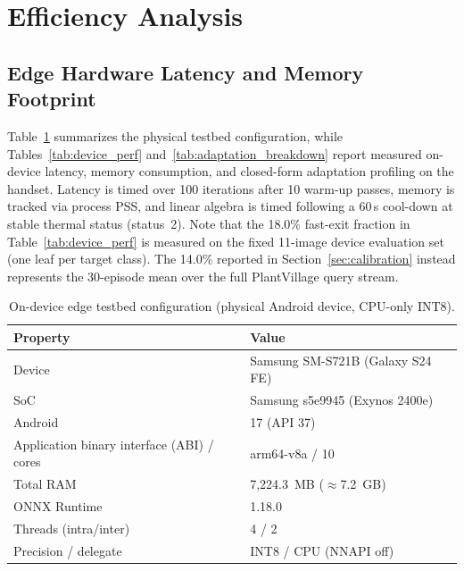 \section{Efficiency Analysis}
\label{sec:efficiency}

\subsection{Edge Hardware Latency and Memory Footprint}
\label{sec:edge_hardware}
Table~\ref{tab:device_spec} summarizes the physical testbed configuration, while Tables~\ref{tab:device_perf} and~\ref{tab:adaptation_breakdown} report measured on-device latency, memory consumption, and closed-form adaptation profiling on the handset. Latency is timed over 100 iterations after 10 warm-up passes, memory is tracked via process PSS, and linear algebra is timed following a 60\,s cool-down at stable thermal status (status~2). Note that the 18.0\% fast-exit fraction in Table~\ref{tab:device_perf} is measured on the fixed 11-image device evaluation set (one leaf per target class). The 14.0\% reported in Section~\ref{sec:calibration} instead represents the 30-episode mean over the full PlantVillage query stream.

\begin{table}[htbp]
\caption{On-device edge testbed configuration (physical Android device, CPU-only INT8).}
\label{tab:device_spec}
\centering

\footnotesize
\begin{tabular}{ll}
\toprule
Property & Value \\
\midrule
Device & Samsung SM-S721B (Galaxy S24 FE) \\
SoC & Samsung s5e9945 (Exynos 2400e) \\
Android & 17 (API 37) \\
Application binary interface (ABI) / cores & arm64-v8a / 10 \\
Total RAM & 7,224.3~MB ($\approx$7.2~GB) \\
ONNX Runtime & 1.18.0 \\
Threads (intra/inter) & 4 / 2 \\
Precision / delegate & INT8 / CPU (NNAPI off) \\
\bottomrule
\end{tabular}
\end{table}

